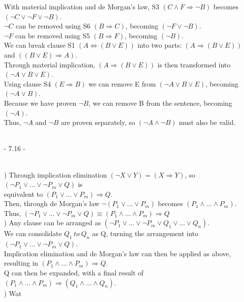 \documentclass[12pt]{article}
\begin{document}
\noindent With material implication and de Morgan's law, S3 $(C\wedge F\Rightarrow \neg B)$ becomes $(\neg C \vee \neg F \vee \neg B)$.\\
\noindent $\neg C$ can be removed using S6 $(B \Rightarrow C)$, becoming $(\neg F \vee \neg B)$.\\
\noindent $\neg F$ can be removed using S5 $(B \Rightarrow F)$, becoming $(\neg B)$.\\

\noindent We can break clause S1 $(A\Leftrightarrow (B\vee E))$ into two parts: $(A \Rightarrow (B \vee E))$ and $((B \vee E) \Rightarrow A)$.\\
\noindent Through material implication, $(A \Rightarrow (B \vee E))$ is then transformed into $(\neg A \vee B \vee E)$.\\
\noindent Using clause S4 $(E \Rightarrow B)$ we can remove E from $(\neg A \vee B \vee E)$, becoming $(\neg A \vee B)$.\\
\noindent Because we have proven $\neg B$, we can remove B from the sentence, becoming $(\neg A)$.\\

\noindent Thus, $\neg A$ and $\neg B$ are proven separately, so $(\neg A \wedge \neg B)$ must also be valid.\\



\noindent \hrulefill \\



\centerline{- 7.16 - }
\ \\
) Through implication elimination $(\neg X \vee Y) = (X \Rightarrow Y)$, so $(\neg P_1 \vee ... \vee \neg P_m \vee Q)$ is \\
\indent equivalent to $( P_1 \vee ... \vee  P_m) \Rightarrow Q$.\\
\indent Then, through de Morgan's law $\neg ( P_1 \vee ... \vee  P_m)$ becomes $( P_1 \wedge ... \wedge  P_m)$.\\
\indent Thus, $(\neg P_1 \vee ... \vee \neg P_m \vee Q) \equiv ( P_1 \wedge ... \wedge  P_m) \Rightarrow Q$\\

) Any clause can be arranged as $(\neg P_1 \vee ... \vee \neg P_m \vee Q_1 \vee ... \vee Q_n)$. \\
\indent We can consolidate $Q_1\ to\ Q_n$ as Q, turning the arrangement into $(\neg P_1 \vee ... \vee \neg P_m \vee Q)$. \\
\indent Implication elimination and de Morgan's law can then be applied as above, \\
\indent resulting in $( P_1 \wedge ... \wedge  P_m) \Rightarrow Q$. \\
\indent Q can then be expanded, with a final result of $( P_1 \wedge ... \wedge  P_m)\Rightarrow( Q_1 \wedge ... \wedge  Q_n)$.\\

) Wat


\noindent \hrulefill \\
\end{document}
